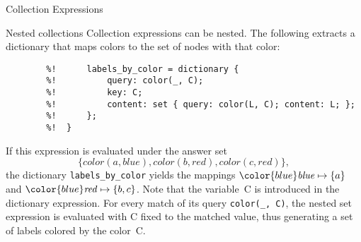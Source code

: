 \documentclass[%
beamer,%
english,%
10pt,%
]{beamer}
\newcommand{\blue}[1]{{\color{blue}#1}}
\begin{document}
\begin{frame}{Collection Expressions}
    \framebreak

    \begin{exampleblock}{Nested collections}
        Collection expressions can be nested.
        The following extracts a dictionary that maps colors to the set of nodes with that color:
        \begin{lstlisting}[basicstyle=\footnotesize,autogobble]
        %!  OUTPUT {
        %!      labels_by_color = dictionary {
        %!          query: color(_, C);
        %!          key: C;
        %!          content: set { query: color(L, C); content: L; };
        %!      };
        %!  }
        \end{lstlisting}
        If this expression is evaluated under the answer set
        \[ \{ \mathit{color}(a, \mathit{blue}), \mathit{color}(b, \mathit{red}), \mathit{color}(c, \mathit{red}) \}, \]
        the dictionary \blue{\lstinline{labels_by_color}} yields the mappings $\blue{\mathit{blue} \mapsto \{a\}}$ and $\blue{\mathit{red} \mapsto \{b,c\}}$.
        Note that the variable~\blue{C} is introduced in the dictionary expression.
        For every match of its query \blue{\lstinline{color(_, C)}},
        the nested set expression is evaluated with \blue{C} fixed to the matched value,
        thus generating a set of labels colored by the color~\blue{C}.
    \end{exampleblock}
\end{frame}
\end{document}
